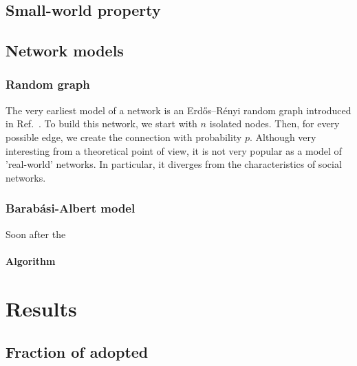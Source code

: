 \documentclass[a4paper,12pt,twoside]{report} %
\begin{document}
\section{Small-world property}


\section{Network models}

\subsection{Random graph}
The very earliest model of a network is an Erdős–Rényi random graph introduced in Ref.~\cite{random_graph}. To build this network, we start with $n$ isolated nodes. Then, for every possible edge, we create the connection with probability $p$. Although very interesting from a theoretical point of view, it is not very popular as a model of 'real-world' networks. In particular, it diverges from the characteristics of social networks.


\subsection{Barabási-Albert model}
Soon after the

\subsubsection{Algorithm}



\chapter{Results}

\section{Fraction of adopted} %
\label{sec:qvoter_results}
\end{document}
